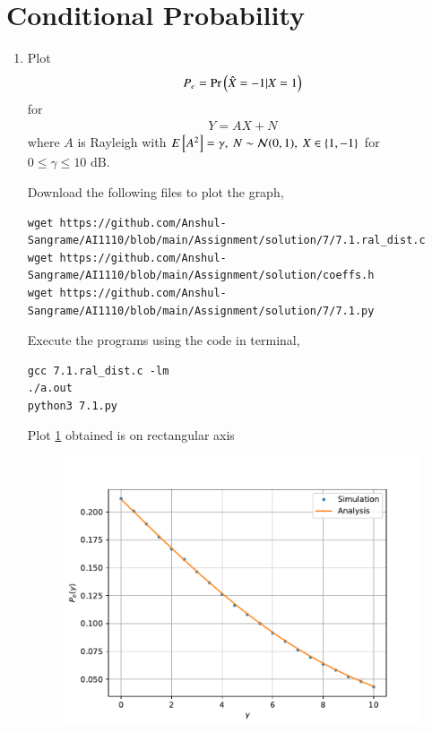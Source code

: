 \documentclass[journal,12pt,twocolumn]{IEEEtran}
\renewcommand\thesection{\arabic{section}}
\begin{document}
\section{Conditional Probability}
\begin{enumerate}[label=\thesection.\arabic*
	,ref=\thesection.\theenumi]
%
\item Plot 
\begin{align}
	P_e = \Pr\left(\hat{X} = -1|X = 1\right)
\end{align}
for 
\begin{align}
	Y = AX + N
\end{align}
where $A$ is Rayleigh with $E{}\left[A^2\right] = \gamma,\ N \sim \mathcal{N}(0, 1),\ X \in \left\{1, -1\right\}$ for $0 \leq \gamma \leq 10 \text{ dB}$.

\solution

Download the following files to plot the graph,
\begin{lstlisting}
wget https://github.com/Anshul-Sangrame/AI1110/blob/main/Assignment/solution/7/7.1.ral_dist.c
wget https://github.com/Anshul-Sangrame/AI1110/blob/main/Assignment/solution/coeffs.h
wget https://github.com/Anshul-Sangrame/AI1110/blob/main/Assignment/solution/7/7.1.py
\end{lstlisting}
Execute the programs using the code in terminal,
\begin{lstlisting}
gcc 7.1.ral_dist.c -lm
./a.out
python3 7.1.py
\end{lstlisting}
Plot \ref{fig:7.1} obtained is on rectangular axis
\begin{figure}[!ht]
    \centering
    \includegraphics[width=\columnwidth]{../figs/7_1.pdf}
    \caption{}
    \label{fig:7.1}
\end{figure}


\end{enumerate}
\end{document}
